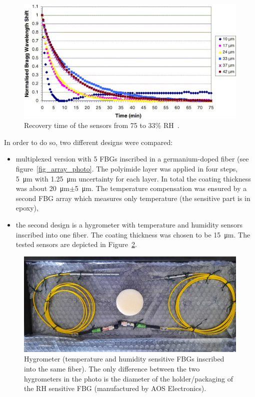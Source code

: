 \begin{figure}[!h]
\centering
\includegraphics[width=0.75\columnwidth]{Chapter5/images/time_response_yeo.jpg}
\caption{Recovery time of the sensors from 75 to 33\% RH~\cite{YEO_PI}.}
\label{fig:yeo2}
\end{figure}

In order to do so, two different designs were compared:
\begin{itemize}
    \item multiplexed version with 5 \glspl{FBG} inscribed in a germanium-doped fiber (see figure~\ref{fig_array_photo}. The polyimide layer was applied in four steps, \SI{5}{\micro\metre} with \SI{1.25}{\micro\metre} uncertainty for each layer. In total the coating thickness was about \SI{20}{\micro\metre}$\pm$\SI{5}{\micro\metre}. The temperature compensation was ensured by a second \gls{FBG} array which measures only temperature (the sensitive part is in epoxy),
    \item the second design is a hygrometer with temperature and humidity sensors inscribed into one fiber. The coating thickness was chosen to be \SI{15}{\micro\metre}. The tested sensors are depicted in Figure~\ref{fig_single_photo}.
\end{itemize}

\begin{figure}[!h]
\centering
\includegraphics[width=0.75\columnwidth]{Chapter5/images/single1.jpeg}
\caption{Hygrometer (temperature and humidity sensitive \glspl{FBG} inscribed into the same fiber). The only difference between the two hygrometers in the photo is the diameter of the holder/packaging of the \gls{RH} sensitive \gls{FBG} (manufactured by AOS Electronics).}
\label{fig_single_photo}
\end{figure}

